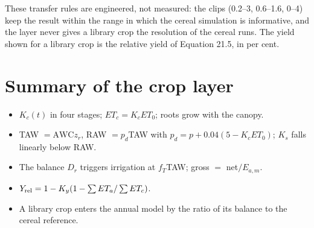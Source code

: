 \begin{keybox}These transfer rules are engineered, not measured: the clips (0.2--3, 0.6--1.6, 0--4) keep the result within the range in which the cereal simulation is informative, and the layer never gives a library crop the resolution of the cereal runs. The yield shown for a library crop is the relative yield of Equation 21.5, in per cent.\end{keybox}

\section{Summary of the crop layer}
\begin{itemize}
\item $K_c(t)$ in four stages; $ET_c=K_cET_0$; roots grow with the canopy.
\item TAW $=\mathrm{AWC}z_r$, RAW $=p_d$TAW with $p_d=p+0.04(5-K_cET_0)$; $K_s$ falls linearly below RAW.
\item The balance $D_r$ triggers irrigation at $f_T$TAW; gross $=$ net$/E_{a,m}$.
\item $Y_{\rm rel}=1-K_y(1-\sum ET_a/\sum ET_c)$.
\item A library crop enters the annual model by the ratio of its balance to the cereal reference.
\end{itemize}
